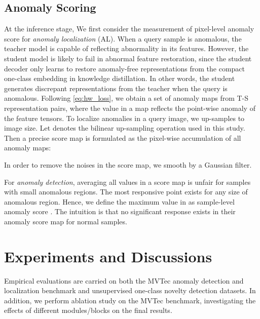 \documentclass[10pt,twocolumn,letterpaper]{article}
\begin{document}
\subsection{Anomaly Scoring}
At the inference stage, We first consider the measurement of pixel-level anomaly score for \emph{anomaly localization} (AL). When a query sample is anomalous, the teacher model is capable of reflecting abnormality in its features. However, the student model is likely to fail in abnormal feature restoration, since the student decoder only learns to restore anomaly-free representations from the compact one-class embedding in knowledge distillation. In other words, the student  generates discrepant representations from the teacher when the query is anomalous. Following \cref{eq:hw_loss}, we obtain a set of anomaly maps from T-S representation pairs, where the value in a map  reflects the point-wise anomaly of the  feature tensors. To localize anomalies in a query image, we up-samples  to image size. Let  denotes the bilinear up-sampling operation used in this study. Then a precise score map  is formulated as the pixel-wise accumulation of all anomaly maps:

In order to remove the noises in the score map, we smooth  by a Gaussian filter.

For \emph{anomaly detection}, averaging all values in a score map  is unfair for samples with small anomalous regions. The most responsive point exists for any size of anomalous region. Hence, we define the maximum value in  as sample-level anomaly score . The intuition is that no significant response exists in their anomaly score map for normal samples.



\section{Experiments and Discussions}
Empirical evaluations are carried on both the MVTec anomaly detection and localization benchmark and unsupervised one-class novelty detection datasets. In addition, we perform ablation study on the MVTec benchmark, investigating the effects of different modules/blocks on the final results.
\end{document}
